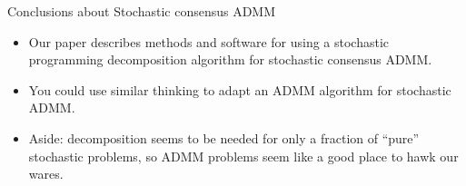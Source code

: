 \documentclass[9pt,usenames,dvipsnames]{beamer}
\begin{document}
\begin{frame}{Conclusions about Stochastic consensus ADMM}
\begin{itemize}
\item Our paper describes methods and software for using a stochastic programming decomposition algorithm for stochastic consensus ADMM.
\item You could use similar thinking to adapt an ADMM algorithm for stochastic ADMM.
\item Aside: decomposition seems to be needed for only a fraction of ``pure'' stochastic problems, so ADMM problems seem like a good place to hawk our wares.
\end{itemize}
\end{frame}
\end{document}
